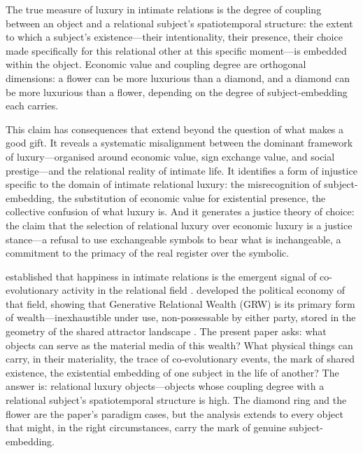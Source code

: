 \begin{claim}
The true measure of luxury in intimate relations is the degree of coupling between an object and a relational subject's spatiotemporal structure: the extent to which a subject's existence---their intentionality, their presence, their choice made specifically for this relational other at this specific moment---is embedded within the object. Economic value and coupling degree are orthogonal dimensions: a flower can be more luxurious than a diamond, and a diamond can be more luxurious than a flower, depending on the degree of subject-embedding each carries.
\end{claim}

This claim has consequences that extend beyond the question of what makes a good gift. It reveals a systematic misalignment between the dominant framework of luxury---organised around economic value, sign exchange value, and social prestige---and the relational reality of intimate life. It identifies a form of injustice specific to the domain of intimate relational luxury: the misrecognition of subject-embedding, the substitution of economic value for existential presence, the collective confusion of what luxury is. And it generates a justice theory of choice: the claim that the selection of relational luxury over economic luxury is a justice stance---a refusal to use exchangeable symbols to bear what is inchangeable, a commitment to the primacy of the real register over the symbolic.

  established that happiness in intimate relations is the emergent signal of co-evolutionary activity in the relational field \parencite{paperxiv}.  developed the political economy of that field, showing that Generative Relational Wealth (GRW) is its primary form of wealth---inexhaustible under use, non-possessable by either party, stored in the geometry of the shared attractor landscape \parencite{paperxv}. The present paper asks: what objects can serve as the material media of this wealth? What physical things can carry, in their materiality, the trace of co-evolutionary events, the mark of shared existence, the existential embedding of one subject in the life of another? The answer is: relational luxury objects---objects whose coupling degree with a relational subject's spatiotemporal structure is high. The diamond ring and the flower are the paper's paradigm cases, but the analysis extends to every object that might, in the right circumstances, carry the mark of genuine subject-embedding.

